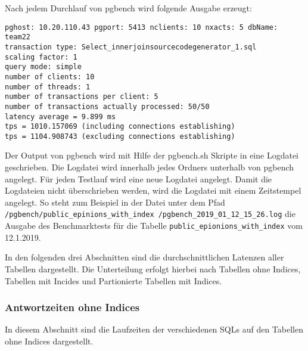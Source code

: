 Nach jedem Durchlauf von pgbench wird folgende Ausgabe erzeugt:

\begin{lstlisting}[caption= Ausgabe pgbench, label={2.outputpgbench.listing}]
pghost: 10.20.110.43 pgport: 5413 nclients: 10 nxacts: 5 dbName: team22
transaction type: Select_innerjoinsourcecodegenerator_1.sql
scaling factor: 1
query mode: simple
number of clients: 10
number of threads: 1
number of transactions per client: 5
number of transactions actually processed: 50/50
latency average = 9.899 ms
tps = 1010.157069 (including connections establishing)
tps = 1104.908743 (excluding connections establishing)
\end{lstlisting}

Der Output von pgbench wird mit Hilfe der pgbench.sh Skripte in eine Logdatei geschrieben. Die Logdatei wird innerhalb jedes Ordners unterhalb von pgbench angelegt.
Für jeden Testlauf wird eine neue Logdatei angelegt. Damit die Logdateien nicht überschrieben werden, wird die Logdatei mit einem Zeitstempel angelegt. So steht zum Beispiel in der Datei unter dem Pfad
 \texttt{/pgbench/public\_epinions\_with\_index /pgbench\_2019\_01\_12\_15\_26.log} die Ausgabe des Benchmarktests für die Tabelle \texttt{public\_epionions\_with\_index} vom 12.1.2019.
 
 In den folgenden drei Abschnitten sind die durchschnittlichen Latenzen aller Tabellen dargestellt. Die Unterteilung erfolgt hierbei nach Tabellen ohne Indices, Tabellen mit Incides und  Partionierte Tabellen mit Indices. 

\newpage
\subsubsection{Antwortzeiten ohne Indices}
In diesem Abschnitt sind die Laufzeiten der verschiedenen SQLs auf den Tabellen ohne Indices dargestellt.
